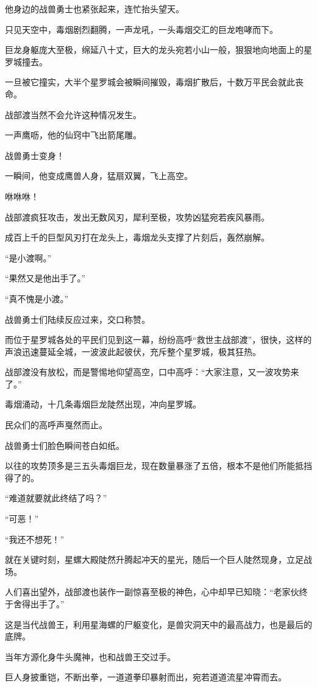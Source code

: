 \begin{this_body}
他身边的战兽勇士也紧张起来，连忙抬头望天。

只见天空中，毒烟剧烈翻腾，一声龙吼，一头毒烟交汇的巨龙咆哮而下。

巨龙身躯庞大至极，绵延八十丈，巨大的龙头宛若小山一般，狠狠地向地面上的星罗城撞去。

一旦被它撞实，大半个星罗城会被瞬间摧毁，毒烟扩散后，十数万平民会就此丧命。

战部渡当然不会允许这种情况发生。

一声鹰呖，他的仙窍中飞出箭尾雕。

战兽勇士变身！

一瞬间，他变成鹰兽人身，猛扇双翼，飞上高空。

咻咻咻！

战部渡疯狂攻击，发出无数风刃，犀利至极，攻势凶猛宛若疾风暴雨。

成百上千的巨型风刃打在龙头上，毒烟龙头支撑了片刻后，轰然崩解。

“是小渡啊。”

“果然又是他出手了。”

“真不愧是小渡。”

战兽勇士们陆续反应过来，交口称赞。

而位于星罗城各处的平民们见到这一幕，纷纷高呼“救世主战部渡”，很快，这样的声浪迅速蔓延全城，一波波此起彼伏，充斥整个星罗城，极其狂热。

战部渡没有放松，而是警惕地仰望高空，口中高呼：“大家注意，又一波攻势来了。”

毒烟涌动，十几条毒烟巨龙陡然出现，冲向星罗城。

民众们的高呼声戛然而止。

战兽勇士们脸色瞬间苍白如纸。

以往的攻势顶多是三五头毒烟巨龙，现在数量暴涨了五倍，根本不是他们所能抵挡得了的。

“难道就要就此终结了吗？”

“可恶！”

“我还不想死！”

就在关键时刻，星螺大殿陡然升腾起冲天的星光，随后一个巨人陡然现身，立足战场。

人们喜出望外，战部渡也装作一副惊喜至极的神色，心中却早已知晓：“老家伙终于舍得出手了。”

这是当代战兽王，利用星海螺的尸躯变化，是兽灾洞天中的最高战力，也是最后的底牌。

当年方源化身牛头魔神，也和战兽王交过手。

巨人身披重铠，不断出拳，一道道拳印暴射而出，宛若道道流星冲霄而去。


\end{this_body}
